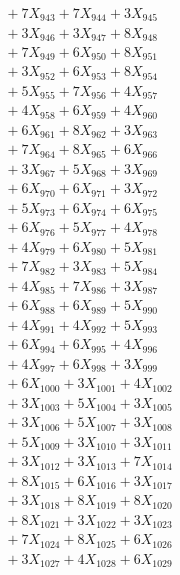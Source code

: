 \documentclass[a4paper,10pt]{article}
\begin{document}
{\begin{align}
&\;  + 7 X_{943} + 7 X_{944} + 3 X_{945} \\[0.3ex]
&\;  + 3 X_{946} + 3 X_{947} + 8 X_{948} \\[0.3ex]
&\;  + 7 X_{949} + 6 X_{950} + 8 X_{951} \\[0.3ex]
&\;  + 3 X_{952} + 6 X_{953} + 8 X_{954} \\[0.3ex]
&\;  + 5 X_{955} + 7 X_{956} + 4 X_{957} \\[0.3ex]
&\;  + 4 X_{958} + 6 X_{959} + 4 X_{960} \\[0.3ex]
&\;  + 6 X_{961} + 8 X_{962} + 3 X_{963} \\[0.3ex]
&\;  + 7 X_{964} + 8 X_{965} + 6 X_{966} \\[0.3ex]
&\;  + 3 X_{967} + 5 X_{968} + 3 X_{969} \\[0.5ex]\allowbreak
&\;  + 6 X_{970} + 6 X_{971} + 3 X_{972} \\[0.3ex]
&\;  + 5 X_{973} + 6 X_{974} + 6 X_{975} \\[0.3ex]
&\;  + 6 X_{976} + 5 X_{977} + 4 X_{978} \\[0.3ex]
&\;  + 4 X_{979} + 6 X_{980} + 5 X_{981} \\[0.3ex]
&\;  + 7 X_{982} + 3 X_{983} + 5 X_{984} \\[0.3ex]
&\;  + 4 X_{985} + 7 X_{986} + 3 X_{987} \\[0.3ex]
&\;  + 6 X_{988} + 6 X_{989} + 5 X_{990} \\[0.3ex]
&\;  + 4 X_{991} + 4 X_{992} + 5 X_{993} \\[0.3ex]
&\;  + 6 X_{994} + 6 X_{995} + 4 X_{996} \\[0.3ex]
&\;  + 4 X_{997} + 6 X_{998} + 3 X_{999} \\[0.5ex]\allowbreak
&\;  + 6 X_{1000} + 3 X_{1001} + 4 X_{1002} \\[0.3ex]
&\;  + 3 X_{1003} + 5 X_{1004} + 3 X_{1005} \\[0.3ex]
&\;  + 3 X_{1006} + 5 X_{1007} + 3 X_{1008} \\[0.3ex]
&\;  + 5 X_{1009} + 3 X_{1010} + 3 X_{1011} \\[0.3ex]
&\;  + 3 X_{1012} + 3 X_{1013} + 7 X_{1014} \\[0.3ex]
&\;  + 8 X_{1015} + 6 X_{1016} + 3 X_{1017} \\[0.3ex]
&\;  + 3 X_{1018} + 8 X_{1019} + 8 X_{1020} \\[0.3ex]
&\;  + 8 X_{1021} + 3 X_{1022} + 3 X_{1023} \\[0.3ex]
&\;  + 7 X_{1024} + 8 X_{1025} + 6 X_{1026} \\[0.3ex]
&\;  + 3 X_{1027} + 4 X_{1028} + 6 X_{1029} \\[0.5ex]\allowbreak

\end{align}}
\end{document}
